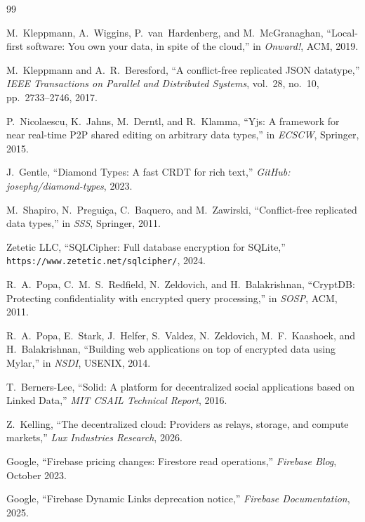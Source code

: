 \begin{thebibliography}{99}

M.~Kleppmann, A.~Wiggins, P.~van~Hardenberg, and M.~McGranaghan, ``Local-first software: You own your data, in spite of the cloud,'' in \emph{Onward!}, ACM, 2019.

M.~Kleppmann and A.~R.~Beresford, ``A conflict-free replicated JSON datatype,'' \emph{IEEE Transactions on Parallel and Distributed Systems}, vol.~28, no.~10, pp.~2733--2746, 2017.

P.~Nicolaescu, K.~Jahns, M.~Derntl, and R.~Klamma, ``Yjs: A framework for near real-time P2P shared editing on arbitrary data types,'' in \emph{ECSCW}, Springer, 2015.

J.~Gentle, ``Diamond Types: A fast CRDT for rich text,'' \emph{GitHub: josephg/diamond-types}, 2023.

M.~Shapiro, N.~Pregui\c{c}a, C.~Baquero, and M.~Zawirski, ``Conflict-free replicated data types,'' in \emph{SSS}, Springer, 2011.

Zetetic LLC, ``SQLCipher: Full database encryption for SQLite,'' \texttt{https://www.zetetic.net/sqlcipher/}, 2024.

R.~A.~Popa, C.~M.~S.~Redfield, N.~Zeldovich, and H.~Balakrishnan, ``CryptDB: Protecting confidentiality with encrypted query processing,'' in \emph{SOSP}, ACM, 2011.

R.~A.~Popa, E.~Stark, J.~Helfer, S.~Valdez, N.~Zeldovich, M.~F.~Kaashoek, and H.~Balakrishnan, ``Building web applications on top of encrypted data using Mylar,'' in \emph{NSDI}, USENIX, 2014.

T.~Berners-Lee, ``Solid: A platform for decentralized social applications based on Linked Data,'' \emph{MIT CSAIL Technical Report}, 2016.

Z.~Kelling, ``The decentralized cloud: Providers as relays, storage, and compute markets,'' \emph{Lux Industries Research}, 2026.

Google, ``Firebase pricing changes: Firestore read operations,'' \emph{Firebase Blog}, October 2023.

Google, ``Firebase Dynamic Links deprecation notice,'' \emph{Firebase Documentation}, 2025.

\end{thebibliography}

